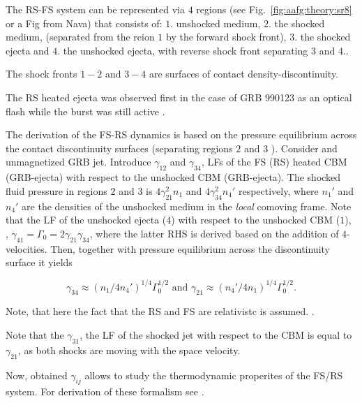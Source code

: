 The \ac{RS}-\ac{FS} system can be represented via $4$ regions (see Fig.~\ref{fig:aafg:theory:sr8} or a Fig from Nava) that consists of: $1.$ unshocked medium, $2.$ the shocked medium, (separated from the reion $1$ by the forward shock front), $3.$ the shocked ejecta and $4.$ the unshocked ejecta, with reverse shock front separating $3$ and $4.$.

The shock fronts $1-2$ and $3-4$ are surfaces of contact density-discontinuity.

The RS heated ejecta was observed first in the case of \ac{GRB} 990123 as an optical flash while the burst was still active \citep{Akerlof:1999aa,Sari:1999a,Meszaros:1999gb}.

The derivation of the \ac{FS}-\ac{RS} dynamics is based on the pressure equilibrium across the contact discontinuity surfaces (separating regions $2$ and $3$ ). 
Consider and unmagnetized \ac{GRB} jet. 
Introduce $\gamma_{12}$ and $\gamma_{34}$, \ac{LF}s of the \ac{FS} (\ac{RS}) heated \ac{CBM} (GRB-ejecta) with respect to the unshocked \ac{CBM} (\ac{GRB}-ejecta). The shocked fluid pressure in regions $2$ and $3$ is $4\gamma_{21}^2 n_1$ and $4\gamma_{34}^2 n_4'$ respectively, where $n_1'$ and $n_4'$ are the densities of the unshocked medium in the \textit{local} comoving frame.
Note that the \ac{LF} of the unshocked ejecta ($4$) with respect to the unshocked \ac{CBM} ($1$), \eg, $\gamma_{41}=\Gamma_0=2\gamma_{21}\gamma_{34}$, where the latter \ac{RHS} is derived based on the addition of $4$-velocities. Then, together with pressure equilibrium across the discontinuity surface  it yields

\begin{equation}
\gamma_{34} \approx (n_1/4n_4')^{1/4}\Gamma_0^{1/2} \text{ and } \gamma_{21} \approx (n_4'/4n_1)^{1/4}\Gamma_0^{1/2}.
\end{equation}

Note, that here the fact that the \ac{RS} and \ac{FS} are relativistc is assumed. .

Note that the $\gamma_{31}$, the \ac{LF} of the shocked jet with respect to the \ac{CBM} is equal to $\gamma_{21}$, as both shocks are moving with the space velocity. 

Now, obtained $\gamma_{ij}$ allows to study the thermodynamic properites of the \ac{FS}/\ac{RS} system. For  derivation of these formalism see \citep{Sari:1995}.

